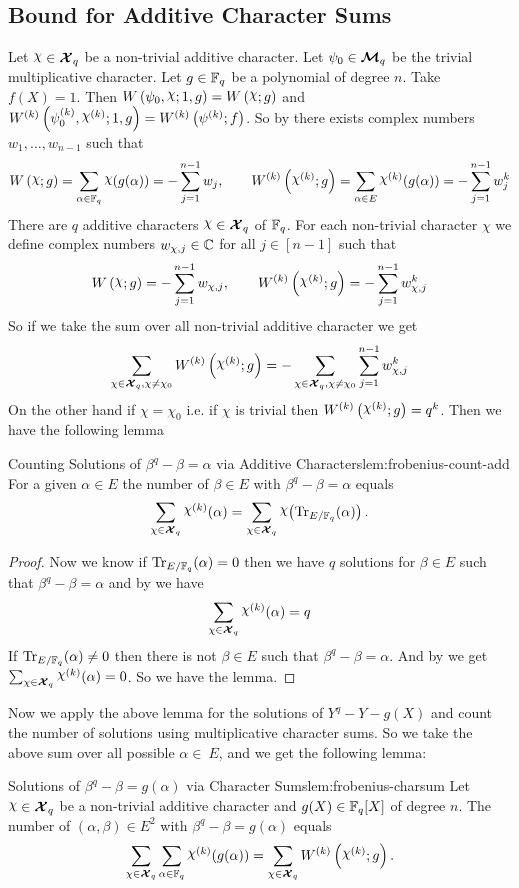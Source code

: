 \subsection{Bound for Additive Character Sums}\label{subsec:achar-weil-bound}
Let $\chi\in\Xq$ be a non-trivial additive character. Let $\psi_0\in\boldsymbol{\mathcal{M}}_q$ be the trivial multiplicative character. Let $g\in\mathbb{F}_q$ be a polynomial of degree $n$. Take $f(X)=1$. Then $W\lt(\psi_0,\chi;1,g\rt)=\Wchi{g}$ and $W^{(k)}\lt(\psi_0^{(k)},\chi^{(k)};1,g\rt)=\Wpsil{k}{f}$. So by \LiftedLRootscor there exists complex numbers $w_1,\dots, w_{n-1}$ such that \begin{equation}\label{eq:achar-complex-root-sum}
  \Wchi{g}=\sum_{\alpha\in\bbF_q}\chi(g(\alpha))=-\sum_{j=1}^{n-1}w_j,\qquad \Wchil{k}{g}=\sum_{\alpha\in E}\chi^{(k)}(g(\alpha))=-\sum_{j=1}^{n-1}w_j^k
\end{equation}There are $q$ additive characters $\chi\in\Xq$ of $\mathbb{F}_q$. For each non-trivial character $\chi$ we define complex numbers $w_{\oldchi,j}\in\bbC$ for all $j\in[n-1]$ such that $$\Wchi{g}=-\sum_{j=1}^{n-1}w_{\oldchi,j},\qquad \Wchil{k}{g}=-\sum_{j=1}^{n-1}w_{\oldchi,j}^k$$So if we take the sum over all non-trivial additive character we get $$\sum_{\oldchi\in\Xq,\oldchi\neq \oldchi_0}\Wchil{k}{g}=-\sum_{\oldchi\in\Xq,\oldchi\neq \oldchi_0}\sum_{j=1}^{n-1}w_{\oldchi,j}^k$$On the other hand if $\chi=\chi_0$ i.e. if $\chi$ is trivial then $\Wchil{k}{g}=q^{k}$. Then we have the following lemma
\begin{lemma}{Counting Solutions of $\beta^q-\beta=\alpha$ via Additive Characters}{lem:frobenius-count-add}
  For a given $\alpha\in E$ the number of $\beta\in E$ with $\beta^q-\beta=\alpha$ equals
  $$\sum_{\oldchi\in\Xq}\chi^{(k)}(\alpha)=\sum_{\oldchi\in\Xq}\chi\!\lt(\tr_{E/\bbF_q}(\alpha)\rt).$$
\end{lemma}
\begin{proof}
  Now we know if $\operatorname{Tr}_{E/\mathbb{F}_q}(\alpha)=0$ then we have $q$ solutions for $\beta\in E$ such that $\beta^q-\beta=\alpha$ and by \AddCharPropsthm[(i)] we have $$\sum_{\oldchi\in\Xq}\chi^{(k)}(\alpha)=q$$If $\operatorname{Tr}_{E/\mathbb{F}_q}(\alpha)\neq 0$ then there is not $\beta\in E$ such that $\beta^q-\beta=\alpha$. And by \AddCharPropsthm[(i)] we get $\sum_{\oldchi\in\Xq}\chi^{(k)}(\alpha)=0$. So we have the lemma. 
\end{proof}

Now we apply the above lemma for the solutions of $Y^q-Y-g(X)$ and count the number of solutions using multiplicative character sums. So we take the above sum over all possible $\alpha\in\ E$, and we get the following lemma:
\begin{lemma}{Solutions of $\beta^q-\beta=g(\alpha)$ via Character Sums}{lem:frobenius-charsum}
  Let $\chi\in\Xq$ be a non-trivial additive character and $g(X)\in\mathbb{F}_q[X]$ of degree $n$. The number of $(\alpha,\beta)\in E^2$ with $\beta^q-\beta=g(\alpha)$ equals $$\sum_{\oldchi\in\Xq}\sum_{\alpha\in\bbF_q}\chi^{(k)}(g(\alpha))=\sum_{\oldchi\in\Xq}\Wchil{k}{g}.$$
\end{lemma}


